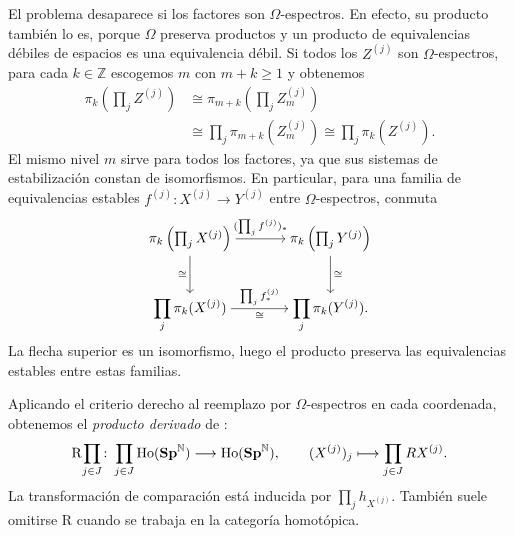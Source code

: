 El problema desaparece si los factores son $\Omega$-espectros. En efecto, su producto también lo es, porque $\Omega$ preserva productos y un producto de equivalencias débiles de espacios es una equivalencia débil. Si todos los $Z^{(j)}$ son $\Omega$-espectros, para cada $k\in\mathbb Z$ escogemos $m$ con $m+k\ge1$ y obtenemos
\[
\begin{aligned}
\pi_k\left(\prod_jZ^{(j)}\right)
&\cong\pi_{m+k}\left(\prod_jZ^{(j)}_m\right)\\
&\cong\prod_j\pi_{m+k}(Z^{(j)}_m)
\cong\prod_j\pi_k(Z^{(j)}).
\end{aligned}
\]
El mismo nivel $m$ sirve para todos los factores, ya que sus sistemas de estabilización constan de isomorfismos. En particular, para una familia de equivalencias estables $f^{(j)}\colon X^{(j)}\to Y^{(j)}$ entre $\Omega$-espectros, conmuta
\[
\begin{tikzcd}[cramped,column sep=large,row sep=large]
\pi_k\left(\prod_jX^{(j)}\right) \arrow[r,"(\prod_jf^{(j)})_*"] \arrow[d,"\cong"']
& \pi_k\left(\prod_jY^{(j)}\right) \arrow[d,"\cong"]\\
\displaystyle\prod_j\pi_k(X^{(j)}) \arrow[r,"\prod_jf^{(j)}_*","\cong"']
& \displaystyle\prod_j\pi_k(Y^{(j)}).
\end{tikzcd}
\]
La flecha superior es un isomorfismo, luego el producto preserva las equivalencias estables entre estas familias.

Aplicando el criterio derecho al reemplazo por $\Omega$-espectros en cada coordenada, obtenemos el \emph{producto derivado} de \cite[Ejemplo~3.4.2.8]{malkiewich}:
\[
\mathrm R\!\prod_{j\in J}\colon
\prod_{j\in J}\operatorname{Ho}(\mathbf{Sp}^{\mathbb N})\longrightarrow\operatorname{Ho}(\mathbf{Sp}^{\mathbb N}),\qquad
(X^{(j)})_j\longmapsto\prod_{j\in J}RX^{(j)}.
\]
La transformación de comparación está inducida por $\prod_jh_{X^{(j)}}$. También suele omitirse $\mathrm R$ cuando se trabaja en la categoría homotópica.

